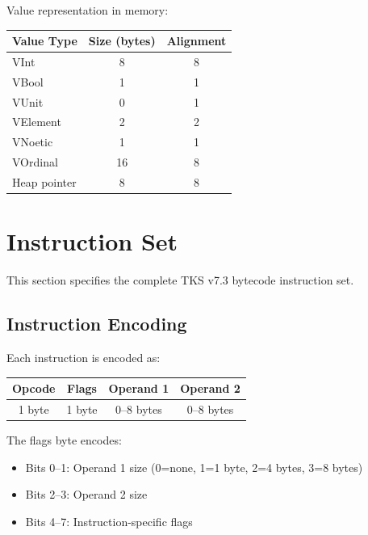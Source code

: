 \begin{definition}
\label{def:value-size}
Value representation in memory:
\begin{center}
\begin{tabular}{lcc}
\toprule
\textbf{Value Type} & \textbf{Size (bytes)} & \textbf{Alignment} \\
\midrule
\textsf{VInt} & 8 & 8 \\
\textsf{VBool} & 1 & 1 \\
\textsf{VUnit} & 0 & 1 \\
\textsf{VElement} & 2 & 2 \\
\textsf{VNoetic} & 1 & 1 \\
\textsf{VOrdinal} & 16 & 8 \\
Heap pointer & 8 & 8 \\
\bottomrule
\end{tabular}
\end{center}
\end{definition}

\section{Instruction Set}
\label{sec:instruction-set}

This section specifies the complete TKS v7.3 bytecode instruction set.

\subsection{Instruction Encoding}
\label{subsec:instruction-encoding}

\begin{definition}
\label{def:instruction-format}
Each instruction is encoded as:
\begin{center}
\begin{tabular}{|c|c|c|c|}
\hline
\textbf{Opcode} & \textbf{Flags} & \textbf{Operand 1} & \textbf{Operand 2} \\
\hline
1 byte & 1 byte & 0--8 bytes & 0--8 bytes \\
\hline
\end{tabular}
\end{center}
The flags byte encodes:
\begin{itemize}
  \item Bits 0--1: Operand 1 size (0=none, 1=1 byte, 2=4 bytes, 3=8 bytes)
  \item Bits 2--3: Operand 2 size
  \item Bits 4--7: Instruction-specific flags
\end{itemize}
\end{definition}

